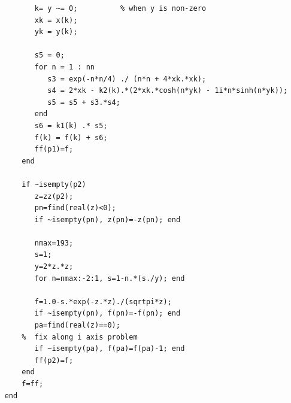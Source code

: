 \documentclass[12pt,twoside,a4paper]{article}
\numberwithin{equation}{subsection}
\numberwithin{figure}{subsection}
\begin{document}
\begin{lstlisting}
		   k= y ~= 0;          % when y is non-zero
		   xk = x(k);
		   yk = y(k);
	
		   s5 = 0;
		   for n = 1 : nn
			  s3 = exp(-n*n/4) ./ (n*n + 4*xk.*xk);
			  s4 = 2*xk - k2(k).*(2*xk.*cosh(n*yk) - 1i*n*sinh(n*yk));
			  s5 = s5 + s3.*s4;
		   end
		   s6 = k1(k) .* s5;
		   f(k) = f(k) + s6;
		   ff(p1)=f;
	    end
	
	    if ~isempty(p2)
		   z=zz(p2);
		   pn=find(real(z)<0);
		   if ~isempty(pn), z(pn)=-z(pn); end
	
		   nmax=193;
		   s=1;
		   y=2*z.*z;
		   for n=nmax:-2:1, s=1-n.*(s./y); end
	
		   f=1.0-s.*exp(-z.*z)./(sqrtpi*z);
		   if ~isempty(pn), f(pn)=-f(pn); end
		   pa=find(real(z)==0);
		%  fix along i axis problem
		   if ~isempty(pa), f(pa)=f(pa)-1; end
		   ff(p2)=f;
	    end
		f=ff;
	end
		
	    
		  
\end{lstlisting}
\end{document}
